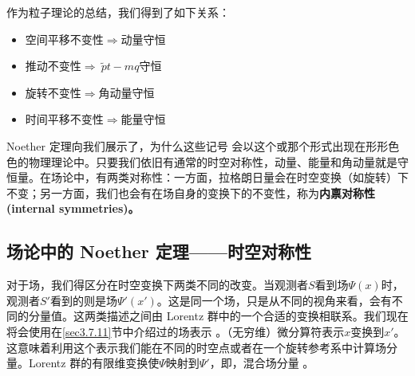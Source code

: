 作为粒子理论的总结，我们得到了如下关系：
\begin{itemize}
\item 空间平移不变性$\Rightarrow$动量守恒
\item 推动不变性$\Rightarrow~\tilde{p}t-mq$守恒
\item 旋转不变性$\Rightarrow$角动量守恒
\item 时间平移不变性$\Rightarrow$能量守恒
\end{itemize}
Noether 定理向我们展示了，为什么这些记号%
%
会以这个或那个形式出现在形形色色的物理理论中。只要我们依旧有通常的时空对称性，动量、能量和角动量就是守恒量。在场论中，有两类对称性：一方面，拉格朗日量会在时空变换（如旋转）下不变；另一方面，我们也会有在场自身的变换下的不变性，称为{\bf 内禀对称性(internal symmetries)。}

\subsection{场论中的 Noether 定理——时空对称性}\label{sec4.5.2}
对于场，我们得区分在时空变换下两类不同的改变。当观测者$S$看到场$\Psi(x)$时，观测者$S'$看到的则是场$\Psi'(x')$。这是同一个场，只是从不同的视角来看，会有不同的分量值。这两类描述之间由 Lorentz 群中的一个合适的变换相联系。我们现在将会使用在\ref{sec3.7.11}节中介绍过的场表示%
。（无穷维）微分算符表示$x$变换到$x'$。这意味着利用这个表示我们能在不同的时空点或者在一个旋转参考系中计算场分量。Lorentz 群的有限维变换使$\Psi$映射到$\Psi'$，即，混合场分量%
。


